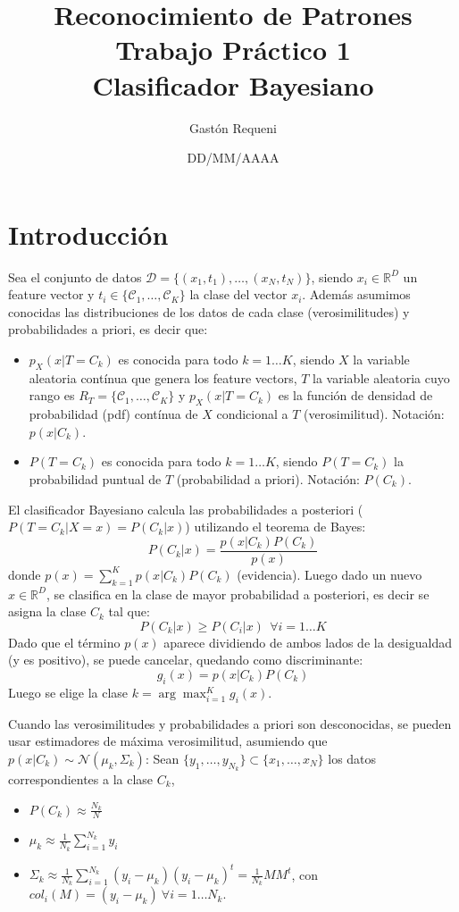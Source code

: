 \documentclass[a4paper,11pt]{article}
\author{Gastón Requeni}
\title{Reconocimiento de Patrones\\ Trabajo Práctico 1\\ Clasificador Bayesiano}
\date{DD/MM/AAAA}
\newcommand{\real}{\mathds{R}}
\begin{document}
\maketitle

\section{Introducción}
Sea el conjunto de datos $\mathcal{D} = \{(x_1,t_1), \dots, (x_N,t_N)\}$, siendo $x_i\in\real^D$ un feature vector y $t_i\in \{\mathcal{C}_1, \dots, \mathcal{C}_K\}$ la clase del vector $x_i$. Además asumimos conocidas las distribuciones de los datos de cada clase (verosimilitudes) y probabilidades a priori, es decir que:
\begin{itemize}
  \item $p_X(x|T = C_k)$ es conocida para todo $k=1\dots K$, siendo $X$ la variable aleatoria contínua que genera los feature vectors, $T$ la variable aleatoria cuyo rango es $R_T = \{\mathcal{C}_1, \dots, \mathcal{C}_K\}$ y $p_X(x|T = C_k)$ es la función de densidad de probabilidad (pdf) contínua de $X$ condicional a $T$ (verosimilitud). Notación: $p(x|C_k)$.
  \item $P(T=C_k)$ es conocida para todo $k=1\dots K$, siendo $P(T=C_k)$ la probabilidad puntual de $T$ (probabilidad a priori). Notación: $P(C_k)$.
\end{itemize}

El clasificador Bayesiano calcula las probabilidades a posteriori ($P(T=C_k|X=x) = P(C_k|x)$) utilizando el teorema de Bayes:
$$P(C_k|x) = \frac{p(x|C_k) P(C_k)}{p(x)}$$
donde $p(x)=\sum_{k=1}^{K} p(x|C_k)P(C_k)$ (evidencia).
Luego dado un nuevo $x\in\real^D$, se clasifica en la clase de mayor probabilidad a posteriori, es decir se asigna la clase $C_k$ tal que:
$$ P(C_k|x) \geq P(C_i|x) \ \ \forall i=1\dots K$$
Dado que el término $p(x)$ aparece dividiendo de ambos lados de la desigualdad (y es positivo), se puede cancelar, quedando como discriminante:
$$g_i(x) = p(x|C_k) P(C_k)$$
Luego se elige la clase $k = \arg \max_{i=1}^{K} g_i(x)$.

Cuando las verosimilitudes y probabilidades a priori son desconocidas, se pueden usar estimadores de máxima verosimilitud, asumiendo que $p(x|C_k)\sim\mathcal{N}(\mu_k, \Sigma_k)$: Sean $\{y_1,\dots, y_{N_k}\} \subset \{x_1,\dots, x_N\}$ los datos correspondientes a la clase $C_k$,
\begin{itemize}
  \item $P(C_k) \approx \frac{N_k}{N}$
  \item $\mu_k \approx \frac{1}{N_k} \sum_{i=1}^{N_k} y_i$
  \item $\Sigma_k \approx \frac{1}{N_k} \sum_{i=1}^{N_k} (y_i - \mu_k)(y_i - \mu_k)^t = \frac{1}{N_k} MM^t$, con
  $col_i(M) = (y_i - \mu_k) \ \forall i=1\dots N_k$. 
\end{itemize}
\end{document}
